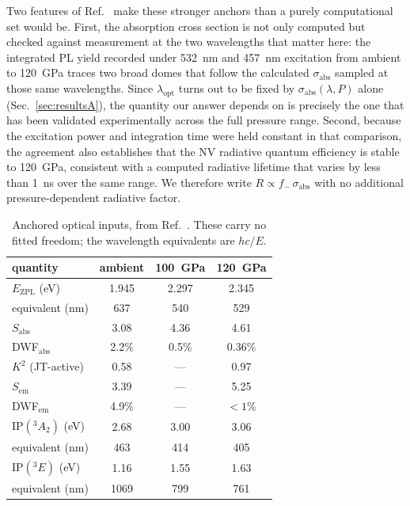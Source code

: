 \documentclass[preprint,12pt]{elsarticle}
\newcommand{\gsA}{\ensuremath{^{3}\!A_{2}}}
\newcommand{\esE}{\ensuremath{^{3}\!E}}
\newcommand{\sabs}{\ensuremath{\sigma_{\mathrm{abs}}}}
\newcommand{\fm}{\ensuremath{f_{-}}}
\newcommand{\lopt}{\ensuremath{\lambda_{\mathrm{opt}}}}
\begin{document}
Two features of Ref.~\cite{Ho2026} make these stronger anchors than a purely
computational set would be. First, the absorption cross section is not only
computed but checked against measurement at the two wavelengths that matter here:
the integrated PL yield recorded under \SI{532}{\nano\meter} and
\SI{457}{\nano\meter} excitation from ambient to \SI{120}{\giga\pascal}
traces two broad domes that follow the calculated $\sabs$ sampled at those same
wavelengths. Since $\lopt$ turns out to be fixed by $\sabs(\lambda,P)$ alone
(Sec.~\ref{sec:resultsA}), the quantity our answer depends on is precisely the
one that has been validated experimentally across the full pressure range.
Second, because the excitation power and integration time were held constant in
that comparison, the agreement also establishes that the NV radiative quantum
efficiency is stable to \SI{120}{\giga\pascal}, consistent with a computed
radiative lifetime that varies by less than \SI{1}{\nano\second} over the same
range. We therefore write $R \propto \fm\,\sabs$ with no additional
pressure-dependent radiative factor.

\begin{table}[t]
  \centering
  \caption{Anchored optical inputs, from Ref.~\cite{Ho2026}. These carry no
  fitted freedom; the wavelength equivalents are $hc/E$.}
  \label{tab:anchors}
  \begin{tabular}{lccc}
    \toprule
    quantity & ambient & \SI{100}{\giga\pascal} & \SI{120}{\giga\pascal} \\
    \midrule
    $E_{\mathrm{ZPL}}$ (eV)      & 1.945 & 2.297 & 2.345 \\
    \quad equivalent (nm)        & 637   & 540   & 529   \\
    $S_{\mathrm{abs}}$           & 3.08  & 4.36  & 4.61  \\
    DWF$_{\mathrm{abs}}$         & 2.2\% & 0.5\% & 0.36\% \\
    $K^2$ (JT-active)            & 0.58  & ---   & 0.97  \\
    $S_{\mathrm{em}}$            & 3.39  & ---   & 5.25  \\
    DWF$_{\mathrm{em}}$          & 4.9\% & ---   & $<1\%$ \\
    $\mathrm{IP}(\gsA)$ (eV)     & 2.68  & 3.00  & 3.06  \\
    \quad equivalent (nm)        & 463   & 414   & 405   \\
    $\mathrm{IP}(\esE)$ (eV)     & 1.16  & 1.55  & 1.63  \\
    \quad equivalent (nm)        & 1069  & 799   & 761   \\
    \bottomrule
  \end{tabular}
\end{table}
\end{document}
